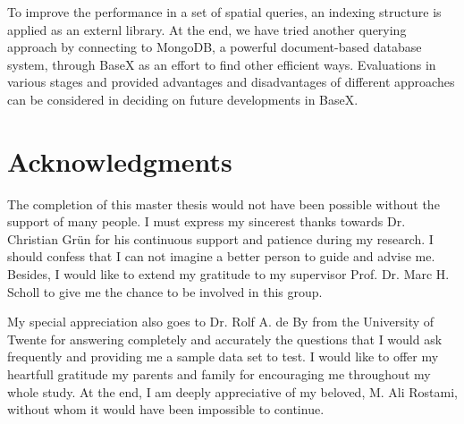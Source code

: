 \documentclass[a4paper,12pt]{article}
\begin{document}
To improve the performance in a set of spatial queries, an indexing structure is applied as an externl library.
At the end, we have tried another querying approach by connecting to MongoDB, a powerful document-based database system, through BaseX as an effort to find other efficient ways.
Evaluations in various stages and provided advantages and disadvantages of different approaches can be considered in deciding on future developments in BaseX.
\thispagestyle{empty}

\newpage
\section*{Acknowledgments}
\thispagestyle{empty}

The completion of this master thesis would not have been possible 
without the support of many people. 
I must express my sincerest thanks towards 
Dr. Christian Gr{\"u}n for his continuous support and patience during my research.
I should confess that I can not imagine a better person to guide and advise me. Besides, I would like to extend my gratitude to my supervisor Prof. Dr. Marc H. Scholl to give me the chance to be involved in this group.

My special appreciation also goes to Dr. Rolf A. de By from the University of Twente for
answering completely and accurately the questions that I would ask
frequently and providing me a sample data set to test. I would like to offer my heartfull gratitude my parents and family for encouraging me 
throughout my whole study. At the end, I am deeply appreciative of my beloved, M. Ali Rostami, without whom it would have been impossible to continue.


\newpage
\tableofcontents

\thispagestyle{empty}
\newpage
\end{document}
